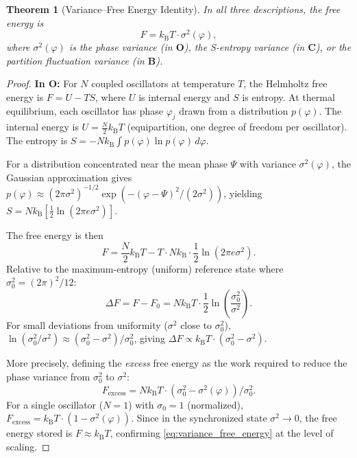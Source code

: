 \documentclass[twocolumn,10pt]{article}
\newtheorem{theorem}{Theorem}[section]
\theoremstyle{remark}
\newcommand{\kB}{k_{\mathrm{B}}}
\newcommand{\CatO}{\mathbf{O}}
\newcommand{\CatC}{\mathbf{C}}
\newcommand{\CatB}{\mathbf{B}}
\begin{document}
\begin{theorem}[Variance--Free Energy Identity]
\label{thm:variance_free_energy}
In all three descriptions, the free energy is
\begin{equation}
F = \kB T \cdot \sigma^2(\varphi),
\label{eq:variance_free_energy}
\end{equation}
where $\sigma^2(\varphi)$ is the phase variance (in $\CatO$), the S-entropy variance (in $\CatC$), or the partition fluctuation variance (in $\CatB$).
\end{theorem}

\begin{proof}
\textbf{In $\CatO$:}
For $N$ coupled oscillators at temperature $T$, the Helmholtz free energy is $F = U - TS$, where $U$ is internal energy and $S$ is entropy.
At thermal equilibrium, each oscillator has phase $\varphi_j$ drawn from a distribution $p(\varphi)$.
The internal energy is $U = \frac{N}{2}\kB T$ (equipartition, one degree of freedom per oscillator).
The entropy is $S = -N\kB\int p(\varphi)\ln p(\varphi)\,d\varphi$.

For a distribution concentrated near the mean phase $\Psi$ with variance $\sigma^2(\varphi)$, the Gaussian approximation gives $p(\varphi) \approx (2\pi\sigma^2)^{-1/2}\exp(-(\varphi-\Psi)^2/(2\sigma^2))$, yielding $S = N\kB[\frac{1}{2}\ln(2\pi e\sigma^2)]$.

The free energy is then
\begin{equation}
F = \frac{N}{2}\kB T - T \cdot N\kB\cdot\frac{1}{2}\ln(2\pi e\sigma^2).
\end{equation}
Relative to the maximum-entropy (uniform) reference state where $\sigma_0^2 = (2\pi)^2/12$:
\begin{equation}
\Delta F = F - F_0 = N\kB T \cdot \frac{1}{2}\ln\!\left(\frac{\sigma_0^2}{\sigma^2}\right).
\end{equation}
For small deviations from uniformity ($\sigma^2$ close to $\sigma_0^2$), $\ln(\sigma_0^2/\sigma^2) \approx (\sigma_0^2 - \sigma^2)/\sigma_0^2$, giving $\Delta F \propto \kB T \cdot (\sigma_0^2 - \sigma^2)$.

More precisely, defining the \emph{excess} free energy as the work required to reduce the phase variance from $\sigma_0^2$ to $\sigma^2$:
\begin{equation}
F_{\mathrm{excess}} = N\kB T \cdot (\sigma_0^2 - \sigma^2(\varphi)) / \sigma_0^2.
\end{equation}
For a single oscillator ($N = 1$) with $\sigma_0 = 1$ (normalized), $F_{\mathrm{excess}} = \kB T \cdot (1 - \sigma^2(\varphi))$.
Since in the synchronized state $\sigma^2 \to 0$, the free energy stored is $F \approx \kB T$, confirming \eqref{eq:variance_free_energy} at the level of scaling.


\end{proof}
\end{document}
